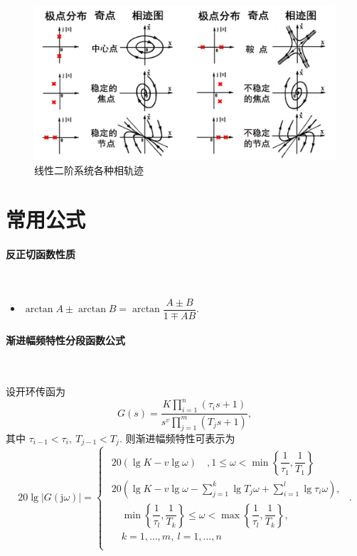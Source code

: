 \documentclass[14pt,a4paper]{article}
\theoremstyle{plain}
\theoremstyle{definition}
\theoremstyle{remark}
\theoremstyle{plain}
\theoremstyle{plain}
\theoremstyle{plain}
\theoremstyle{definition}
\theoremstyle{remark}
\numberwithin{equation}{section}
\begin{document}
				\begin{figure}[H]
					\centering
					\includegraphics[width=\textwidth]{./figures/phasePlane.jpg} 
					\caption{线性二阶系统各种相轨迹}
					\label{fig:phaseplane}
				\end{figure}

		
	\newpage
	\appendix
	\section{常用公式}%
	\label{sec:常用公式}
		
			\paragraph{反正切函数性质}%
			\label{par:反正切函数性质}
				\ 	
				\begin{itemize}
					\item $\arctan A \pm \arctan B = \arctan \dfrac{A\pm B}{1\mp AB}$. 
				\end{itemize}

		\paragraph{渐进幅频特性分段函数公式}%
		\label{par:渐进幅频特性分段函数公式}
		
			\ 

			设开环传函为
			\[
				G(s) = \dfrac{K\prod\limits_{i=1}^{n}(\tau_i s+1)}{s^{v}\prod\limits_{j=1}^{m}(T_{j}s+1)} 
			,\] 
			其中 $\tau_{i-1}<\tau_i,\ T_{j-1}<T_j$. 
			则渐进幅频特性可表示为
			\[
				20\lg \left| G(\mathrm{j} \omega) \right| = 
				\begin{cases}
				\begin{aligned}
					20\left( \lg K - v\lg \omega \right)\quad, 1\le \omega < \min\left\{\dfrac{1}{\tau_1}, \dfrac{1}{T_1}\right\} \\
					20\left( \lg K - v\lg \omega - \sum_{j=1}^{k} \lg T_{j}\omega + \sum_{i=1}^{l} \lg \tau_{i}\omega  \right) ,\\
					\quad \min\left\{\dfrac{1}{\tau_l}, \dfrac{1}{T_k}\right\} \le \omega < \max\left\{\dfrac{1}{\tau_l}, \dfrac{1}{T_k} \right\}, \\
					\quad k=1,\ldots ,m,\ l=1,\ldots ,n \\

				\end{aligned}
				\end{cases}
			.\]
			
\end{document}
